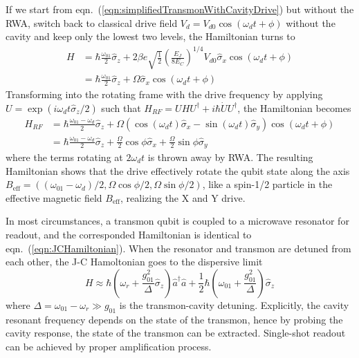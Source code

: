 \documentclass[%
groupedaddress,
showpacs,
 amsmath,amssymb,
 aps,
prb,
]{revtex4-1}
\begin{document}
            If we start from eqn.~(\ref{eqn:simplifiedTransmonWithCavityDrive}) but without the RWA, switch back to classical drive field $V_d = V_{d0}\cos(\omega_d t + \phi) $ without the cavity and keep only the lowest two levels, the Hamiltonian turns to
            \begin{align}
                H &= \hbar \frac{\omega_{01}}{2} \hat \sigma_z + 2 \beta e \sqrt{ \frac{1}{2}} \left ( \frac{E_J}{8E_C} \right )^{1/4} V_{d0} \hat \sigma_x \cos(\omega_d t + \phi) \\
                &=   \hbar \frac{\omega_{01}}{2} \hat \sigma_z + \Omega \hat \sigma_x \cos(\omega_d t + \phi)
            \end{align}
            Transforming into the rotating frame with the drive frequency by applying $ U = \exp(i \omega_d t \hat \sigma_z /2) $ such that $ H_{RF} = UHU^\dagger + i\hbar \dot U U^\dagger $, the Hamiltonian becomes
            \begin{align}
                H_{RF} &= \hbar \frac{\omega_{01} - \omega_d}{2} \hat \sigma_z + \Omega ( \cos (\omega_d t) \hat \sigma_x - \sin (\omega_d t) \hat \sigma_y )\cos(\omega_d t + \phi)\\
                & = \hbar \frac{\omega_{01} - \omega_d}{2} \hat \sigma_z + \frac{\Omega}{2} \cos \phi \hat \sigma_x+ \frac{\Omega}{2} \sin \phi \hat \sigma_y
            \end{align}
            where the terms rotating at $ 2 \omega_d t $ is thrown away by RWA. The resulting Hamiltonian shows that the drive effectively rotate the qubit state along the axis $B_{\text{eff}} = ((\omega_{01} - \omega_d)/2,\Omega \cos \phi /2,\Omega \sin \phi /2)$, like a spin-1/2 particle in the effective magnetic field $B_{\text{eff}}$, realizing the X and Y drive.

            In most circumstances, a transmon qubit is coupled to a microwave resonator for readout, and the corresponded Hamiltonian is identical to eqn.~(\ref{eqn:JCHamiltonian}). When the resonator and transmon are detuned from each other, the J-C Hamoltonian goes to the dispersive limit\cite{Blais2004,schuster2007circuit}
            \begin{equation}
                H \approx \hbar \left (\omega_r + \frac{g_{01}^2}{\Delta} \hat \sigma_z \right )\hat a^\dagger \hat a+ \frac{1}{2} \hbar \left(\omega_{01} + \frac{g_{01}^2}{\Delta}\right) \hat \sigma_z
            \end{equation}
            where $ \Delta = \omega_{01} - \omega_r \gg g_{01}$ is the transmon-cavity detuning. Explicitly, the cavity resonant frequency depends on the state of the transmon, hence by probing the cavity response, the state of the transmon can be extracted. Single-shot readout can be achieved by proper amplification process\cite{Mallet2009,Sliwa2016}.
\end{document}
